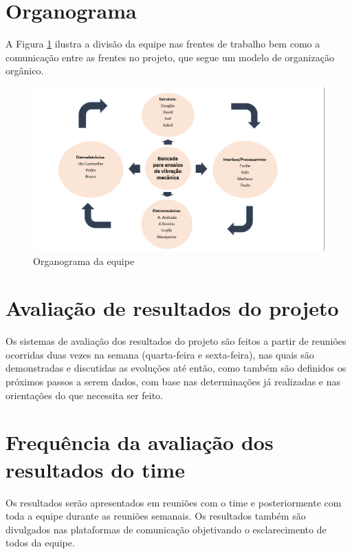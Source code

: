 \section*{Organograma}

A Figura \ref{organograma} ilustra a divisão da equipe nas frentes de trabalho bem como a comunicação entre as frentes no projeto, que segue um modelo de organização orgânico.

\begin{figure}[!ht]
\centering
\includegraphics[keepaspectratio=true,scale=0.5]{figuras/organograma.png}
\caption{Organograma da equipe}
\label{organograma}
\end{figure} 


\section*{Avaliação de resultados do projeto}
 Os sistemas de avaliação dos resultados do projeto são feitos a partir de reuniões ocorridas duas vezes na semana (quarta-feira e sexta-feira), nas quais são demonstradas e discutidas as evoluções até então, como também são definidos os próximos passos a serem dados, com base nas determinações já realizadas e nas orientações do que necessita ser feito.

\section*{Frequência da avaliação dos resultados do time}
Os resultados serão apresentados em reuniões com o time e posteriormente com toda a equipe durante as reuniões semanais. Os resultados também são divulgados nas plataformas de comunicação objetivando o esclarecimento de todos da equipe. 


